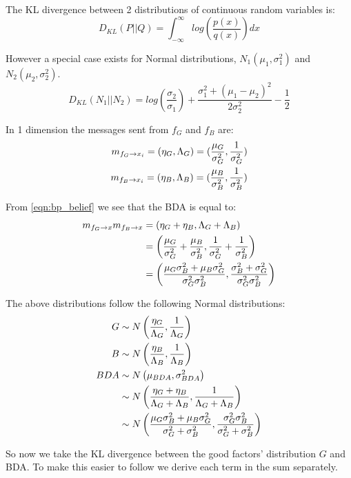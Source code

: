 The KL divergence between 2 distributions of continuous random variables is:
\begin{equation}
    D_{KL}(P || Q) = \int_{-\infty}^{\infty} log\left( \frac{p(x)}{q(x)} \right) dx
\end{equation}

However a special case exists for Normal distributions, $N_1(\mu_1, \sigma_1^2)$ and $N_2(\mu_2, \sigma_2^2)$.
\begin{equation}
    D_{KL}(N_1 || N_2) = log\left(\frac{\sigma_2}{\sigma_1}\right) + \frac{\sigma_1^2 + (\mu_1 - \mu_2)^2}{2\sigma_2^2} - \frac{1}{2}
\end{equation}

In 1 dimension the messages sent from $f_G$ and $f_B$ are:
\begin{eqnarray}
    m_{f_G \rightarrow x_i} = (\eta_G, \Lambda_G) = (\frac{\mu_G}{\sigma_G^2}, \frac{1}{\sigma_G^2})\\
    m_{f_B \rightarrow x_i} = (\eta_B, \Lambda_B) = (\frac{\mu_B}{\sigma_B^2}, \frac{1}{\sigma_B^2}) \label{eqn:attacker_msg}
\end{eqnarray}

From \ref{eqn:bp_belief} we see that the BDA is equal to:
\begin{align}
    m_{f_G \rightarrow x} m_{f_B \rightarrow x} 
    &= (\eta_G + \eta_B, \Lambda_G + \Lambda_B)\\
    &= \left(\frac{\mu_G}{\sigma_G^2} + \frac{\mu_B}{\sigma_B^2}, \frac{1}{\sigma_G^2} + \frac{1}{\sigma_B^2}\right)\\
    &= \left(\frac{\mu_G\sigma_B^2 + \mu_B\sigma_G^2}{\sigma_G^2 \sigma_B^2}, \frac{\sigma_B^2 + \sigma_G^2}{\sigma_G^2 \sigma_B^2}\right)
\end{align}

The above distributions follow the following Normal distributions:
\begin{align}
    G &\sim N\left(\frac{\eta_G}{\Lambda_G}, \frac{1}{\Lambda_G}\right)\\
    B &\sim N\left(\frac{\eta_B}{\Lambda_B}, \frac{1}{\Lambda_B}\right)\\
    BDA &\sim N\left(\mu_{BDA}, \sigma_{BDA}^2\right)\\
    &\sim N\left(\frac{\eta_G + \eta_B}{\Lambda_G + \Lambda_B}, \frac{1}{\Lambda_G + \Lambda_B}\right)\\
    &\sim N\left(\frac{\mu_G\sigma_B^2 + \mu_B\sigma_G^2}{\sigma_G^2 + \sigma_B^2}, \frac{\sigma_G^2 \sigma_B^2}{\sigma_G^2 + \sigma_B^2}\right) \label{eqn:bda_distribution}
\end{align}

So now we take the KL divergence between the good factors' distribution $G$ and BDA. To make this easier to follow we derive each term in the sum separately.

